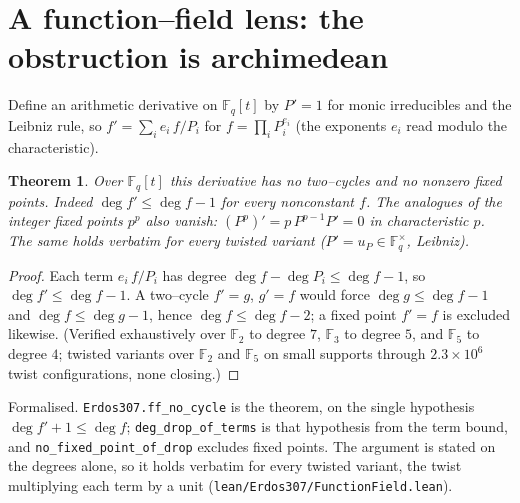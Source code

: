 \documentclass[11pt]{article}
\newtheorem{theorem}{Theorem}[section]
\theoremstyle{definition}
\begin{document}
\section{A function--field lens: the obstruction is archimedean}\label{sec:ff}

Define an arithmetic derivative on $\mathbb{F}_q[t]$ by $P'=1$ for monic irreducibles and the Leibniz
rule, so $f'=\sum_i e_i\,f/P_i$ for $f=\prod_i P_i^{e_i}$ (the exponents $e_i$ read modulo the
characteristic).

\begin{theorem}\label{thm:ff}
Over $\mathbb{F}_q[t]$ this derivative has no two--cycles and no nonzero fixed points. Indeed
$\deg f'\le\deg f-1$ for every nonconstant $f$. The analogues of the integer fixed points $p^{p}$ also
vanish: $(P^{p})'=p\,P^{p-1}P'=0$ in characteristic $p$. The same holds verbatim for every twisted
variant ($P'=u_P\in\mathbb{F}_q^\times$, Leibniz).
\end{theorem}
\begin{proof}
Each term $e_i\,f/P_i$ has degree $\deg f-\deg P_i\le\deg f-1$, so $\deg f'\le\deg f-1$. A two--cycle
$f'=g$, $g'=f$ would force $\deg g\le\deg f-1$ and $\deg f\le\deg g-1$, hence $\deg f\le\deg f-2$;
a fixed point $f'=f$ is excluded likewise. (Verified exhaustively over $\mathbb{F}_2$ to degree $7$,
$\mathbb{F}_3$ to degree $5$, and $\mathbb{F}_5$ to degree $4$; twisted variants over $\mathbb{F}_2$ and
$\mathbb{F}_5$ on small supports through $2.3\times10^{6}$ twist configurations, none closing.)
\end{proof}

\noindent\textup{Formalised.} \texttt{Erdos307.ff\_no\_cycle} is the theorem, on the single
hypothesis $\deg f'+1\le\deg f$; \texttt{deg\_drop\_of\_terms} is that hypothesis from the term
bound, and \texttt{no\_fixed\_point\_of\_drop} excludes fixed points. The argument is stated on the
degrees alone, so it holds verbatim for every twisted variant, the twist multiplying each term by a
unit \textup{(\texttt{lean/Erdos307/FunctionField.lean})}.
\end{document}
